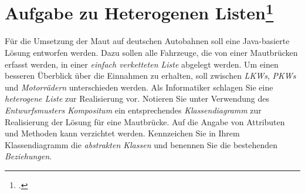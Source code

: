 \documentclass{lehramt-informatik-haupt}
\begin{document}
%

\section{Aufgabe zu Heterogenen Listen\footcite[Seite 1, Aufgabe 1: Heterogene Liste]{aud:pu:4}}

Für die Umsetzung der Maut auf deutschen Autobahnen soll eine
Java-basierte Lösung entworfen werden. Dazu sollen alle Fahrzeuge, die
von einer Mautbrücken erfasst werden, in einer \emph{einfach verketteten
Liste} abgelegt werden. Um einen besseren Überblick über die Einnahmen
zu erhalten, soll zwischen \emph{LKWs}, \emph{PKWs} und
\emph{Motorrädern} unterschieden werden. Als Informatiker schlagen Sie
eine \emph{heterogene Liste} zur Realisierung vor. Notieren Sie unter
Verwendung des \emph{Entwurfsmusters Kompositum} ein entsprechendes
\emph{Klassendiagramm} zur Realisierung der Lösung für eine Mautbrücke.
Auf die Angabe von Attributen und Methoden kann verzichtet werden.
Kennzeichen Sie in Ihrem Klassendiagramm die \emph{abstrakten Klassen}
und benennen Sie die bestehenden \emph{Beziehungen}.

\begin{center}
\end{center}

%
\end{document}
